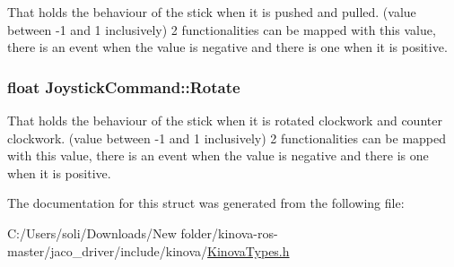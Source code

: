 That holds the behaviour of the stick when it is pushed and pulled. (value between -\/1 and 1 inclusively) 2 functionalities can be mapped with this value, there is an event when the value is negative and there is one when it is positive. 

\subsubsection[{\texorpdfstring{Rotate}{Rotate}}]{\setlength{\rightskip}{0pt plus 5cm}float Joystick\+Command\+::\+Rotate}\hypertarget{struct_joystick_command_a02fece0bcf6cfc2135f294a3dbe9db4e}{}\label{struct_joystick_command_a02fece0bcf6cfc2135f294a3dbe9db4e}


That holds the behaviour of the stick when it is rotated clockwork and counter clockwork. (value between -\/1 and 1 inclusively) 2 functionalities can be mapped with this value, there is an event when the value is negative and there is one when it is positive. 



The documentation for this struct was generated from the following file\+:\begin{DoxyCompactItemize}
\item 
C\+:/\+Users/soli/\+Downloads/\+New folder/kinova-\/ros-\/master/jaco\+\_\+driver/include/kinova/\hyperlink{_kinova_types_8h}{Kinova\+Types.\+h}\end{DoxyCompactItemize}
